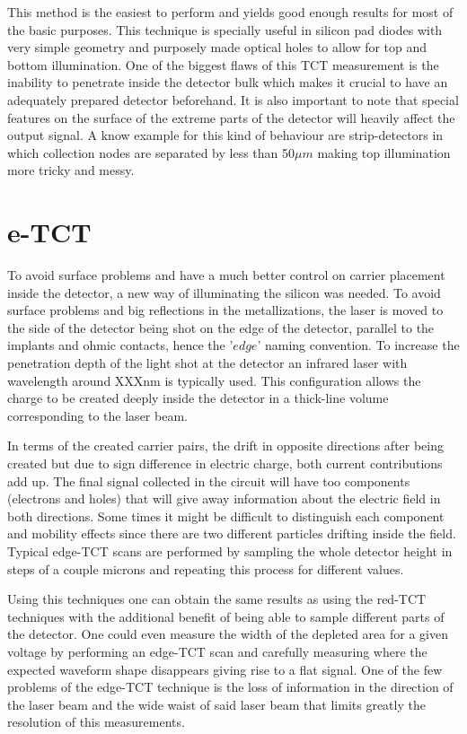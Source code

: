 This method is the easiest to perform and yields good enough results for most of the basic purposes. This technique is specially useful in silicon pad diodes with very simple geometry and purposely made optical holes to allow for top and bottom illumination. One of the biggest flaws of this TCT measurement is the inability to penetrate inside the detector bulk which makes it crucial to have an adequately prepared detector beforehand. It is also important to note that special features on the surface of the extreme parts of the detector will heavily affect the output signal. A know example for this kind of behaviour are strip-detectors in which collection nodes are separated by less than 50$\mu m$ making top illumination more tricky and messy.

\section{e-TCT} %
\label{sec:fitting_method}

To avoid surface problems and have a much better control on carrier placement inside the detector, a new way of illuminating the silicon was needed. To avoid surface problems and big reflections in the metallizations, the laser is moved to the side of the detector being shot on the edge of the detector, parallel to the implants and ohmic contacts, hence the '$edge$' naming convention. To increase the penetration depth of the light shot at the detector an infrared laser with wavelength around XXXnm is typically used. This configuration allows the charge to be created deeply inside the detector in a thick-line volume corresponding to the laser beam.

In terms of the created carrier pairs, the drift in opposite directions after being created but due to sign difference in electric charge, both current contributions add up. The final signal collected in the circuit will have too components (electrons and holes) that will give away information about the electric field in both directions. Some times it might be difficult to distinguish each component and mobility effects since there are two different particles drifting inside the field. Typical edge-TCT scans are performed by sampling the whole detector height in steps of a couple microns and repeating this process for different \vias values.

Using this techniques one can obtain the same results as using the red-TCT techniques with the additional benefit of being able to sample different parts of the detector. One could even measure the width of the depleted area for a given voltage by performing an edge-TCT scan and carefully measuring where the expected waveform shape disappears giving rise to a flat signal. One of the few problems of the edge-TCT technique is the loss of information in the direction of the laser beam and the wide waist of said laser beam that limits greatly the resolution of this measurements.

